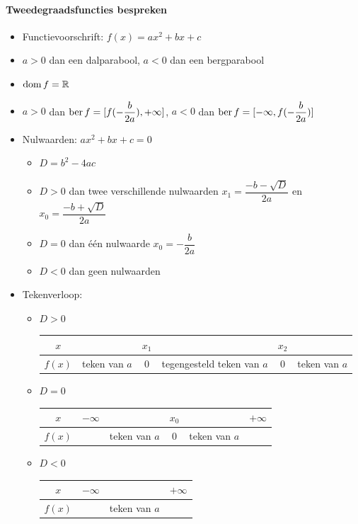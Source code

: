 \documentclass[12pt]{article}
\begin{document}
\begin{theorie}

\pagebreak
\paragraph*{Tweedegraadsfuncties bespreken}
\begin{mdframed}
  \begin{itemize}
  \item Functievoorschrift: $f(x)=ax^2 + bx + c$
  \item $a>0$ dan een dalparabool, $a<0$ dan een bergparabool
  \item $\dom f = \mathbb{R}$
  \item $a>0$ dan $\ber f = [f(-\dfrac{b}{2a}), +\infty]$, $a<0$ dan $\ber f = [-\infty, f(-\dfrac{b}{2a})]$
  \item Nulwaarden: $ax^2+bx+c=0$
    \renewcommand{\labelitemii}{$\bullet$}
    \begin{itemize}
    \item $D=b^2-4ac$
    \item $D>0$ dan twee verschillende nulwaarden $x_1=\dfrac{-b-\sqrt{D}}{2a}$ en $x_0=\dfrac{-b+\sqrt{D}}{2a}$
    \item $D=0$ dan één nulwaarde $x_0=-\dfrac{b}{2a}$
    \item $D<0$ dan geen nulwaarden
    \end{itemize}
  \item Tekenverloop:
    \begin{itemize}
    \item $D>0$
      \begin{tabular}{c|p{1.5cm}cp{2.5cm}cp{1.5cm}}
        $x$ & & $x_1$ & & $x_2$ &\\
        \hline
        $f(x)$ & teken van $a$ & 0 & tegengesteld teken van $a$ & 0 & teken van $a$
      \end{tabular}
    \item $D=0$
      \begin{tabular}{c|lp{1.5cm}cp{1.5cm}r}
        $x$ & $-\infty$ & & $x_0$ & & $+\infty$\\
        \hline
        $f(x)$ & & teken van $a$ & 0 & teken van $a$ &
      \end{tabular}
    \item $D<0$
      \begin{tabular}{c|lcr}
        $x$ & $-\infty$ &  & $+\infty$\\
        \hline
        $f(x)$ & & teken van $a$ &
      \end{tabular}

\end{itemize}
\end{itemize}
\end{mdframed}
\end{theorie}
\end{document}

